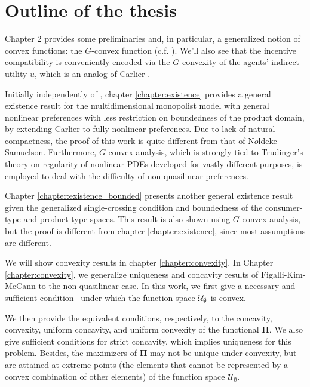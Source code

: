 \section{Outline of the thesis}


	Chapter 2 provides some preliminaries and, in particular, a generalized notion of convex functions: the $G$-convex function (c.f. \cite{Trudinger14,Balder77,Singer97}).
	We'll also see that the incentive compatibility is conveniently encoded via the  $G$-convexity
	of the agents' indirect utility $u$, which is an analog of Carlier \cite{Carlier01}.
	\medskip

	Initially independently of \cite{NoldekeSamuelson15p}, chapter \ref{chapter:existence}  provides a general existence result for the multidimensional monopolist model with general nonlinear preferences with less restriction on boundedness of the product domain, {by extending} %
	Carlier \cite{Carlier01} to fully nonlinear preferences. Due to lack of natural compactness, the proof of this work is quite different from that of N$\ddot{o}$ldeke-Samuelson. Furthermore, $G$-convex analysis, which is strongly tied to Trudinger's theory on regularity of nonlinear PDEs \cite{Trudinger14}  developed for vastly different purposes, is employed to deal with the difficulty of non-quasilinear preferences.	
	\medskip



Chapter \ref{chapter:existence_bounded} presents another general existence result given the generalized single-crossing condition and boundedness of the consumer-type and product-type spaces. This result is also shown using $G$-convex analysis, but the proof is different from chapter \ref{chapter:existence}, since most assumptions are different.\medskip


We will show convexity results in chapter \ref{chapter:convexity}. In Chapter \ref{chapter:convexity}, we generalize uniqueness and concavity results of Figalli-Kim-McCann to the non-quasilinear case. In this work, we first give a necessary and sufficient condition \Gthree~under which the function space $\mathcal{U}_{\emptyset}$ is convex. \medskip

We then provide the equivalent conditions, respectively, to the concavity, convexity, uniform concavity, and uniform convexity of the functional $\pmb\Pi$. We also give sufficient conditions for strict concavity, which implies uniqueness for this problem. Besides, the maximizers of $\pmb\Pi$ may not be unique under convexity, but are attained at extreme points (the elements that cannot be represented by a convex combination of other elements) of the function space $\mathcal{U}_{\emptyset}$.\medskip 


